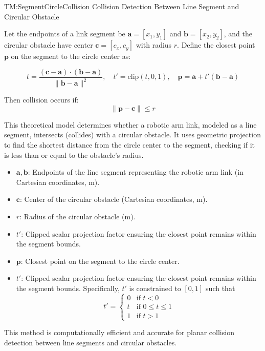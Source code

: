 \documentclass[12pt]{article}
\newcommand{\deftheory}[9][Not Applicable]
{
\newpage
\noindent \rule{\textwidth}{0.5mm}

\paragraph{RefName: } \textbf{#2} \phantomsection 
\label{#2}

\paragraph{Label:} #3

\noindent \rule{\textwidth}{0.5mm}

\paragraph{Equation:}

#4

\paragraph{Description:}

#5

\paragraph{Notes:}

#6

\paragraph{Source:}

#7

\paragraph{Ref.\ By:}

#8

\paragraph{Preconditions for \hyperref[#2]{#2}:}
\label{#2_precond}

#9

\paragraph{Derivation for \hyperref[#2]{#2}:}
\label{#2_deriv}

#1

\noindent \rule{\textwidth}{0.5mm}

}
\begin{document}
\noindent
{}
{TM:SegmentCircleCollision}
{Collision Detection Between Line Segment and Circular Obstacle}
{
Let the endpoints of a link segment be $\mathbf{a}=[x_1, y_1]$ and $\mathbf{b}=[x_2, y_2]$, and the circular obstacle have center $\mathbf{c}=[c_x, c_y]$ with radius $r$. Define the closest point $\mathbf{p}$ on the segment to the circle center as:

\[
t = \frac{(\mathbf{c}-\mathbf{a})\cdot(\mathbf{b}-\mathbf{a})}{\|\mathbf{b}-\mathbf{a}\|^2}, \quad
t' = \text{clip}(t, 0, 1), \quad
\mathbf{p} = \mathbf{a}+ t'(\mathbf{b}-\mathbf{a})
\]

Then collision occurs if:
\[
\|\mathbf{p}-\mathbf{c}\|\le r
\]
}
{
This theoretical model determines whether a robotic arm link, modeled as a line segment, intersects (collides) with a circular obstacle. It uses geometric projection to find the shortest distance from the circle center to the segment, checking if it is less than or equal to the obstacle's radius.

\begin{itemize}
    \item $\mathbf{a}, \mathbf{b}$: Endpoints of the line segment representing the robotic arm link (in Cartesian coordinates, \si{\metre}).
    \item $\mathbf{c}$: Center of the circular obstacle (Cartesian coordinates, \si{\metre}).
    \item $r$: Radius of the circular obstacle (\si{\metre}).
    \item $t'$: Clipped scalar projection factor ensuring the closest point remains within the segment bounds.
    \item $\mathbf{p}$: Closest point on the segment to the circle center.
    \item $t'$: Clipped scalar projection factor ensuring the closest point remains within the segment bounds. Specifically, $t'$ is constrained to $[0, 1]$ such that
    \[
    t' = 
    \begin{cases}
        0 & \text{if } t < 0 \\
        t & \text{if } 0 \leq t \leq 1 \\
        1 & \text{if } t > 1
    \end{cases}
    \]
\end{itemize}

This method is computationally efficient and accurate for planar collision detection between line segments and circular obstacles.
}
\end{document}
